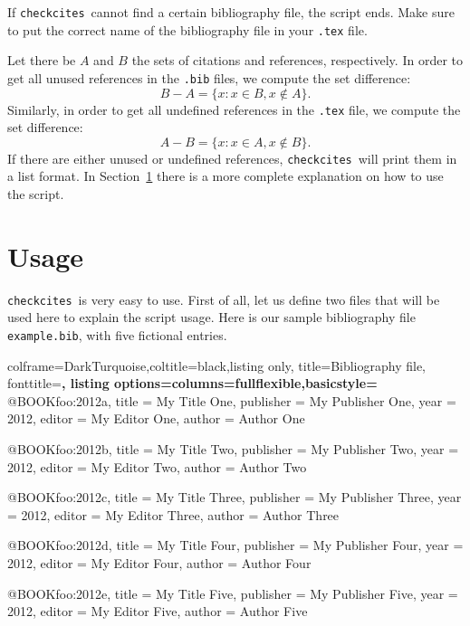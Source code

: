 \documentclass[12pt,a4paper]{article}
\newcommand{\checkcites}{\texttt{checkcites}}
\newenvironment{infoblock}[1]
  {\par\addvspace{\medskipamount}
   \begin{tcolorbox}[colframe=DarkTurquoise,coltitle=black,fonttitle=\bfseries,title=#1]}
  {\end{tcolorbox}\addvspace{\medskipamount}}
\begin{document}
\begin{infoblock}{Attention!}
If \checkcites\ cannot  find a certain bibliography  file, the script
ends. Make sure  to put the correct name of  the bibliography file in
your \verb|.tex| file.
\end{infoblock}

Let  there be  $A$  and $B$  the sets  of  citations and  references,
respectively.  In  order   to  get  all  unused   references  in  the
\verb|.bib| files, we compute the set difference:
\[
B - A = \{ x : x \in B, x \notin A \}.
\]
Similarly,  in  order   to  get  all  undefined   references  in  the
\verb|.tex| file, we compute the set difference:
\[
A - B = \{ x : x \in A, x \notin B \}.
\]
If there are either unused or undefined references, \checkcites\ will
print them  in a list  format. In Section~\ref{sec:usage} there  is a
more complete explanation on how to use the script.

\section{Usage}
\label{sec:usage}

\checkcites\ is  very easy to  use. First of  all, let us  define two
files that will be used here to explain the script usage. Here is our
sample  bibliography  file  \verb|example.bib|, with  five  fictional
entries.

\begin{tcblisting}{colframe=DarkTurquoise,coltitle=black,listing only,
                   title=Bibliography file, fonttitle=\bfseries,
                   listing options={columns=fullflexible,basicstyle=\ttfamily}}
@BOOK{foo:2012a,
  title = {My Title One},
  publisher = {My Publisher One},
  year = {2012},
  editor = {My Editor One},
  author = {Author One}
}

@BOOK{foo:2012b,
  title = {My Title Two},
  publisher = {My Publisher Two},
  year = {2012},
  editor = {My Editor Two},
  author = {Author Two}
}

@BOOK{foo:2012c,
  title = {My Title Three},
  publisher = {My Publisher Three},
  year = {2012},
  editor = {My Editor Three},
  author = {Author Three}
}

@BOOK{foo:2012d,
  title = {My Title Four},
  publisher = {My Publisher Four},
  year = {2012},
  editor = {My Editor Four},
  author = {Author Four}
}

@BOOK{foo:2012e,
  title = {My Title Five},
  publisher = {My Publisher Five},
  year = {2012},
  editor = {My Editor Five},
  author = {Author Five}
}
\end{tcblisting}
\end{document}
